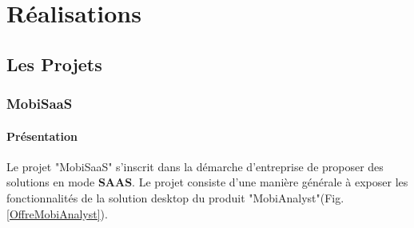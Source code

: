 \chapter{Réalisations}
\label{Developpement}


\section{Les Projets}

\subsection{MobiSaaS}

\subsubsection{Présentation}

Le projet "MobiSaaS" s'inscrit dans la démarche d'entreprise de proposer des solutions en mode \textbf{SAAS}. Le projet consiste d'une manière générale à exposer les fonctionnalités de la solution desktop du produit "MobiAnalyst"(Fig. \ref{OffreMobiAnalyst}).

